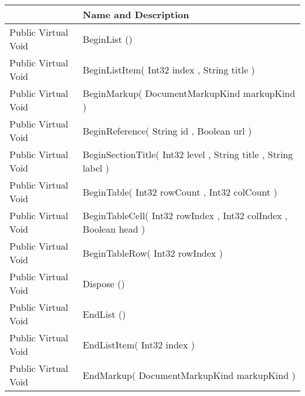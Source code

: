 \documentclass[11pt, oneside, a4paper]{book}
\begin{document}
\begin{center}
\begin{tabular}{| p{3cm} | p{12cm} | }
\hline
\textbf{ } & \textbf{ Name and Description}\\
\hline
 Public  Virtual  Void &  BeginList ()\hypertarget{SoftwareEngineeringTools.{}Documentation.{}LatexGenerator.{}BeginList}{}\\
\hline
 Public  Virtual  Void &  BeginListItem(\hypertarget{SoftwareEngineeringTools.{}Documentation.{}LatexGenerator.{}BeginListItem\_Int32\_String}{} Int32  index  ,  String  title  )\\
\hline
 Public  Virtual  Void &  BeginMarkup(\hypertarget{SoftwareEngineeringTools.{}Documentation.{}LatexGenerator.{}BeginMarkup\_DocumentMarkupKind}{} DocumentMarkupKind  markupKind  )\\
\hline
 Public  Virtual  Void &  BeginReference(\hypertarget{SoftwareEngineeringTools.{}Documentation.{}LatexGenerator.{}BeginReference\_String\_Boolean}{} String  id  ,  Boolean  url  )\\
\hline
 Public  Virtual  Void &  BeginSectionTitle(\hypertarget{SoftwareEngineeringTools.{}Documentation.{}LatexGenerator.{}BeginSectionTitle\_Int32\_String\_String}{} Int32  level  ,  String  title  ,  String  label  )\\
\hline
 Public  Virtual  Void &  BeginTable(\hypertarget{SoftwareEngineeringTools.{}Documentation.{}LatexGenerator.{}BeginTable\_Int32\_Int32}{} Int32  rowCount  ,  Int32  colCount  )\\
\hline
 Public  Virtual  Void &  BeginTableCell(\hypertarget{SoftwareEngineeringTools.{}Documentation.{}LatexGenerator.{}BeginTableCell\_Int32\_Int32\_Boolean}{} Int32  rowIndex  ,  Int32  colIndex  ,  Boolean  head  )\\
\hline
 Public  Virtual  Void &  BeginTableRow(\hypertarget{SoftwareEngineeringTools.{}Documentation.{}LatexGenerator.{}BeginTableRow\_Int32}{} Int32  rowIndex  )\\
\hline
 Public  Virtual  Void &  Dispose ()\hypertarget{SoftwareEngineeringTools.{}Documentation.{}LatexGenerator.{}Dispose}{}\\
\hline
 Public  Virtual  Void &  EndList ()\hypertarget{SoftwareEngineeringTools.{}Documentation.{}LatexGenerator.{}EndList}{}\\
\hline
 Public  Virtual  Void &  EndListItem(\hypertarget{SoftwareEngineeringTools.{}Documentation.{}LatexGenerator.{}EndListItem\_Int32}{} Int32  index  )\\
\hline
 Public  Virtual  Void &  EndMarkup(\hypertarget{SoftwareEngineeringTools.{}Documentation.{}LatexGenerator.{}EndMarkup\_DocumentMarkupKind}{} DocumentMarkupKind  markupKind  )\\

\end{tabular}
\end{center}
\end{document}
